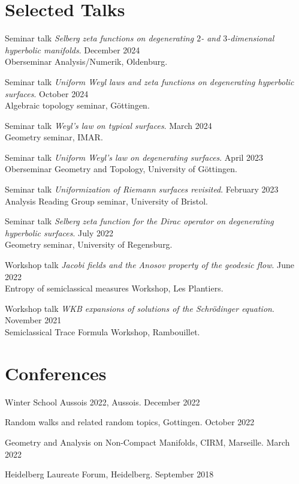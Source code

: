 \documentclass[a4paper, 11pt]{article}
\begin{document}
\section{Selected Talks}
 \begin{itemize}[leftmargin=0.5cm]
 	{\item{
 			Seminar talk \textit{Selberg zeta functions on degenerating $2$- and $3$-dimensional \\ hyperbolic manifolds}.
 			\hfill
 			December 2024\\
 			Oberseminar Analysis/Numerik, Oldenburg.
 	}}
	{\item{
			Seminar talk \textit{Uniform Weyl laws and zeta functions on degenerating hyperbolic surfaces}.
			\hfill
			October 2024\\
			Algebraic topology seminar, G\" ottingen.
	}}
	{\item{
			Seminar talk \textit{Weyl's law on typical surfaces}.
			\hfill
			March 2024\\
			Geometry seminar, IMAR.
	}}
	{\item{
			Seminar talk \textit{Uniform Weyl's law on degenerating surfaces}.
			\hfill
			April 2023\\
			Oberseminar Geometry and Topology, University of Göttingen.
	}}
	{\item{
			Seminar talk \textit{Uniformization of Riemann surfaces revisited}.
			\hfill
			February 2023\\
			Analysis Reading Group seminar, University of Bristol.
	}}
	{\item{
		Seminar talk \textit{Selberg zeta function for the Dirac operator on degenerating hyperbolic surfaces}.
		\hfill
		July 2022\\
		Geometry seminar, University of Regensburg.
	}}
	{\item{
			Workshop talk \textit{Jacobi fields and the Anosov property of the geodesic flow}.
			\hfill
			June 2022\\
			Entropy of semiclassical measures Workshop, Les Plantiers.
	}}
	{\item{
			Workshop talk \textit{WKB expansions of solutions of the Schrödinger equation}.
			\hfill
			November 2021\\
			Semiclassical Trace Formula Workshop, Rambouillet.
	}}
\end{itemize}

\section{Conferences}
\begin{itemize}[leftmargin=0.5cm]
	{\item{
			Winter School Aussois 2022, Aussois. 
			\hfill
			December 2022
	}}
	{\item{
			Random walks and related random topics, Gottingen. 
			\hfill
			October 2022
	}}
	{\item{
			Geometry and Analysis on Non-Compact Manifolds, CIRM, Marseille.
			\hfill
			March 2022
	}}
	{\item{
			Heidelberg Laureate Forum, Heidelberg.
			\hfill
			September 2018
	}}
	
\end{itemize}
\end{document}
